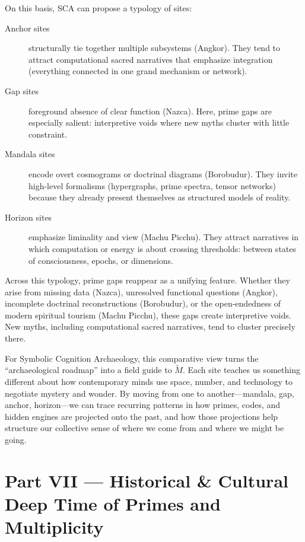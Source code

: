 \documentclass[12]{amsart}
\theoremstyle{plain}
\begin{document}
On this basis, SCA can propose a typology of sites:

\begin{description}
  \item[Anchor sites] structurally tie together multiple subsystems (Angkor). They tend to attract computational sacred narratives that emphasize integration (everything connected in one grand mechanism or network).
  \item[Gap sites] foreground absence of clear function (Nazca). Here, prime gaps are especially salient: interpretive voids where new myths cluster with little constraint.
  \item[Mandala sites] encode overt cosmograms or doctrinal diagrams (Borobudur). They invite high-level formalisms (hypergraphs, prime spectra, tensor networks) because they already present themselves as structured models of reality.
  \item[Horizon sites] emphasize liminality and view (Machu Picchu). They attract narratives in which computation or energy is about crossing thresholds: between states of consciousness, epochs, or dimensions.
\end{description}

Across this typology, prime gaps reappear as a unifying feature. Whether they arise from missing data (Nazca), unresolved functional questions (Angkor), incomplete doctrinal reconstructions (Borobudur), or the open-endedness of modern spiritual tourism (Machu Picchu), these gaps create interpretive voids. New myths, including computational sacred narratives, tend to cluster precisely there.

For Symbolic Cognition Archaeology, this comparative view turns the ``archaeological roadmap'' into a field guide to $\tilde M$. Each site teaches us something different about how contemporary minds use space, number, and technology to negotiate mystery and wonder. By moving from one to another—mandala, gap, anchor, horizon—we can trace recurring patterns in how primes, codes, and hidden engines are projected onto the past, and how those projections help structure our collective sense of where we come from and where we might be going.


\section*{Part VII — Historical \& Cultural Deep Time of Primes and Multiplicity}
\end{document}

